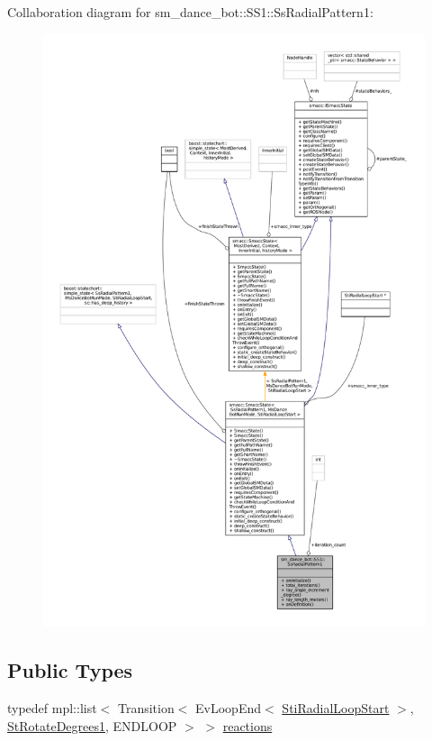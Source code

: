 Collaboration diagram for sm\+\_\+dance\+\_\+bot\+:\+:S\+S1\+:\+:Ss\+Radial\+Pattern1\+:
\nopagebreak
\begin{figure}[H]
\begin{center}
\leavevmode
\includegraphics[width=350pt]{structsm__dance__bot_1_1SS1_1_1SsRadialPattern1__coll__graph}
\end{center}
\end{figure}
\subsection*{Public Types}
\begin{DoxyCompactItemize}
\item 
typedef mpl\+::list$<$ Transition$<$ Ev\+Loop\+End$<$ \hyperlink{structsm__dance__bot_1_1radial__motion__states_1_1StiRadialLoopStart}{Sti\+Radial\+Loop\+Start} $>$, \hyperlink{structsm__dance__bot_1_1StRotateDegrees1}{St\+Rotate\+Degrees1}, E\+N\+D\+L\+O\+OP $>$ $>$ \hyperlink{structsm__dance__bot_1_1SS1_1_1SsRadialPattern1_a771bd101df407fefe77cd6932405c94a}{reactions}
\end{DoxyCompactItemize}
